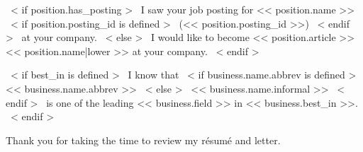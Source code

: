 ~< if position.has_posting >~
    I saw your job posting for << position.name >>
    ~< if position.posting_id is defined >~ (<< position.posting_id >>) ~< endif >~ at your company.
~< else >~
    I would like to become << position.article >> << position.name|lower >> at your company.
~< endif >~

~< if best_in is defined >~
    I know that
    ~< if business.name.abbrev is defined >~
        << business.name.abbrev >>
    ~< else >~
        << business.name.informal >>
    ~< endif >~
    is one of the leading << business.field >> in << business.best_in >>.
~< endif >~

Thank you for taking the time to review my résumé and letter.

